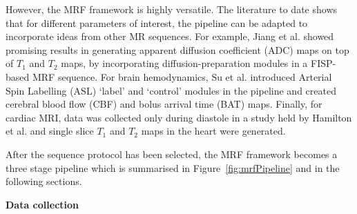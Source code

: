 \hfill

However, the MRF framework is highly versatile.
The literature to date shows that for different parameters of interest, the pipeline can be adapted to incorporate ideas from other MR sequences.
For example, Jiang et al. \cite{Jiang2017} showed promising results in generating apparent diffusion coefficient (ADC) maps on top of $T_1$ and $T_2$ maps, by incorporating diffusion-preparation modules \cite{Thomas1998} in a FISP-based MRF sequence.
For brain hemodynamics, Su et al. \cite{Su2017} introduced Arterial Spin Labelling (ASL) `label' and `control' modules in the pipeline and created cerebral blood flow (CBF) and bolus arrival time (BAT) maps.
Finally, for cardiac MRI, data was collected only during diastole in a study held by Hamilton et al. \cite{Hamilton2017} and single slice $T_1$ and $T_2$ maps in the heart were generated.

\hfill

After the sequence protocol has been selected, the MRF framework becomes a three stage pipeline which is summarised in Figure~\ref{fig:mrfPipeline} and in the following sections.

\hfill

\large\textbf{Data collection} \normalsize

